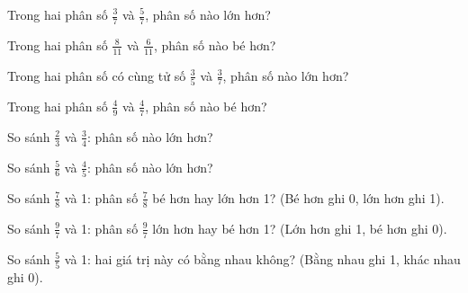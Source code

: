 \begin{ex}
Trong hai phân số $\frac{3}{7}$ và $\frac{5}{7}$, phân số nào lớn hơn?
\end{ex}

\begin{ex}
Trong hai phân số $\frac{8}{11}$ và $\frac{6}{11}$, phân số nào bé hơn?
\end{ex}

\begin{ex}
Trong hai phân số có cùng tử số $\frac{3}{5}$ và $\frac{3}{7}$, phân số nào lớn hơn?
\end{ex}

\begin{ex}
Trong hai phân số $\frac{4}{9}$ và $\frac{4}{7}$, phân số nào bé hơn?
\end{ex}

\begin{ex}
So sánh $\frac{2}{3}$ và $\frac{3}{4}$: phân số nào lớn hơn?
\end{ex}

\begin{ex}
So sánh $\frac{5}{6}$ và $\frac{4}{5}$: phân số nào lớn hơn?
\end{ex}

\begin{ex}
So sánh $\frac{7}{8}$ và 1: phân số $\frac{7}{8}$ bé hơn hay lớn hơn 1? (Bé hơn ghi 0, lớn hơn ghi 1).
\end{ex}

\begin{ex}
So sánh $\frac{9}{7}$ và 1: phân số $\frac{9}{7}$ lớn hơn hay bé hơn 1? (Lớn hơn ghi 1, bé hơn ghi 0).
\end{ex}

\begin{ex}
So sánh $\frac{5}{5}$ và 1: hai giá trị này có bằng nhau không? (Bằng nhau ghi 1, khác nhau ghi 0).
\end{ex}

